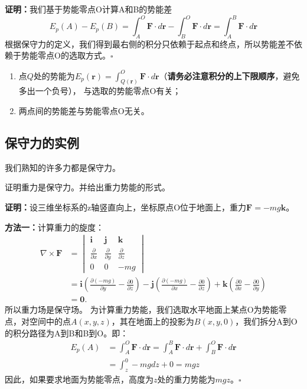\noindent \textbf{证明：}我们基于势能零点O计算A和B的势能差
\[
    E_p(A) - E_p(B) = \int_{A}^{O}  \mathbf{F}\cdot d\mathbf{r}  - \int_{B}^{O}  \mathbf{F}\cdot d\mathbf{r} = \int_{A}^{B}  \mathbf{F}\cdot d\mathbf{r}
\]
根据保守力的定义，我们得到最右侧的积分只依赖于起点和终点，所以势能差不依赖于势能零点O的选取方式。\hfill$\square$
\begin{tcolorbox}[colback=white!5!white, colframe=red!75!black, title=保守场势能小结]
    \begin{enumerate}
        \item 点$Q$处的势能为$
                  E_p(\textbf{r}) = \int_{Q(\textbf{r})}^{O}  \mathbf{F}\cdot d\mathbf{r}
              $（\textbf{请务必注意积分的上下限顺序}，避免多出一个负号），
              与选取的势能零点O有关；
        \item 两点间的势能差与势能零点O无关。
    \end{enumerate}
\end{tcolorbox}
\subsection{保守力的实例}
我们熟知的许多力都是保守力。
\begin{tcolorbox}[colback=white!5!white,colframe=green!50!black,title=重力]
    证明重力是保守力。并给出重力势能的形式。
\end{tcolorbox}
\noindent \textbf{证明：}设三维坐标系的z轴竖直向上，坐标原点O位于地面上，重力$\mathbf{F} = -mg \mathbf{k}$。

\textbf{方法一：}计算重力的旋度：
\[
    \begin{aligned}
        \nabla \times \mathbf{F} & =
        \begin{vmatrix}
            \mathbf{i}                  & \mathbf{j}                  & \mathbf{k}                  \\
            \frac{\partial}{\partial x} & \frac{\partial}{\partial y} & \frac{\partial}{\partial z} \\
            0                           & 0                           & -mg
        \end{vmatrix}
        \\&= \mathbf{i}\left(\frac{\partial (-mg)}{\partial y} - \frac{\partial 0}{\partial z}\right) - \mathbf{j}\left(\frac{\partial (-mg)}{\partial x} - \frac{\partial 0}{\partial z}\right) + \mathbf{k}\left(\frac{\partial 0}{\partial x} - \frac{\partial 0}{\partial y}\right)\\& = \mathbf{0}.
    \end{aligned}
\]
所以重力场是保守场。
为计算重力势能，我们选取水平地面上某点O为势能零点，对空间中的点$A(x,y,z)$，其在地面上的投影为$B(x,y,0)$，我们拆分A到O的积分路径为A到B和B到O。即：
\[
    \begin {aligned}
    E_p(A) &=  \int_{A}^{O}  \mathbf{F}\cdot d\mathbf{r} = \int_{A}^{B}  \mathbf{F}\cdot d\mathbf{r} + \int_{B}^{O}  \mathbf{F}\cdot d\mathbf{r}
    \\&= \int_{z}^{0} -mg dz + 0 = mgz
    \end{aligned}
\]
因此，如果要求地面为势能零点，高度为$z$处的重力势能为$mgz$。\hfill$\square$


